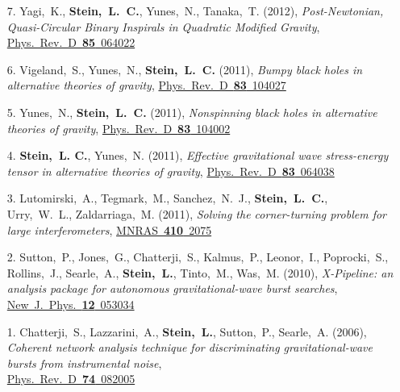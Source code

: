 \begin{enumerate}
\item[{7.}] Yagi,~K., {\bf Stein,~L.~C.}, Yunes,~N.,
  Tanaka,~T. (2012), {\it Post-Newtonian, Quasi-Circular Binary
    Inspirals in Quadratic Modified Gravity},
  \href{http://dx.doi.org/10.1103/PhysRevD.85.064022}{Phys.~Rev.~D~{\bf 85}~064022}
\item[{6.}] Vigeland,~S., Yunes,~N., {\bf Stein,~L.~C.} (2011), {\it
    Bumpy black holes in alternative theories of gravity},
  \href{http://dx.doi.org/10.1103/PhysRevD.83.104027}{Phys.~Rev.~D~{\bf 83}~104027}
\item[{5.}] Yunes,~N., {\bf Stein,~L.~C.} (2011), {\it Nonspinning
    black holes in alternative theories of gravity},
  \href{http://dx.doi.org/10.1103/PhysRevD.83.104002}{Phys.~Rev.~D~{\bf 83}~104002}
\item[{4.}] {\bf Stein,~L. C.}, Yunes,~N. (2011), {\it Effective
    gravitational wave stress-energy tensor in alternative theories of
    gravity},
  \href{http://dx.doi.org/10.1103/PhysRevD.83.064038}{Phys.~Rev.~D~{\bf 83}~064038}
\item[{3.}] Lutomirski,~A., Tegmark,~M., Sanchez,~N.~J., {\bf
    Stein,~L.~C.},
  Urry,~W.~L., Zaldarriaga,~M. (2011), {\it Solving the
    corner-turning problem for large interferometers},
  \href{http://dx.doi.org/10.1111/j.1365-2966.2010.17587.x}{MNRAS~{\bf 410}~2075}
\item[{2.}] Sutton,~P., Jones,~G., Chatterji,~S., Kalmus,~P., Leonor,~I.,
  Poprocki,~S., Rollins,~J., Searle,~A., {\bf Stein,~L.}, Tinto,~M.,
  Was,~M. (2010), {\it X-Pipeline: an analysis package for autonomous
    gravitational-wave burst searches},
  \href{http://dx.doi.org/10.1088/1367-2630/12/5/053034}{New~J.~Phys.~{\bf 12}~053034}
\item[{1.}] Chatterji,~S., Lazzarini,~A., {\bf Stein,~L.}, Sutton,~P.,
  Searle,~A. (2006), {\it Coherent network analysis technique for
    discriminating gravitational-wave bursts from instrumental noise},\\
  \href{http://dx.doi.org/10.1103/PhysRevD.74.082005}{Phys.~Rev.~D~{\bf 74}~082005}
\end{enumerate}

